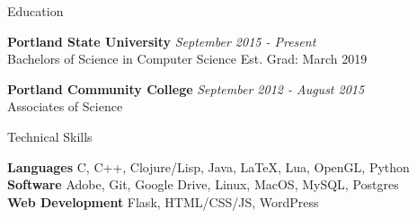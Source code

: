 \documentclass{resume} %
\begin{document}

\begin{rSection}{Education}

{\bf Portland State University} \hfill {\em September 2015 - Present} \\
{Bachelors of Science in Computer Science} \hfill {Est. Grad: March 2019}

{\bf Portland Community College} \hfill {\em September 2012 - August 2015} \\
{Associates of Science} \hfill {}

\end{rSection}


\begin{rSection}{Technical Skills}

{\bf Languages} \hfill {C, C++, Clojure/Lisp, Java, LaTeX, Lua, OpenGL, Python} \\
{\bf Software} \hfill {Adobe, Git, Google Drive, Linux, MacOS, MySQL, Postgres} \\
{\bf Web Development} \hfill {Flask, HTML/CSS/JS, WordPress}


\end{rSection}

\end{document}
